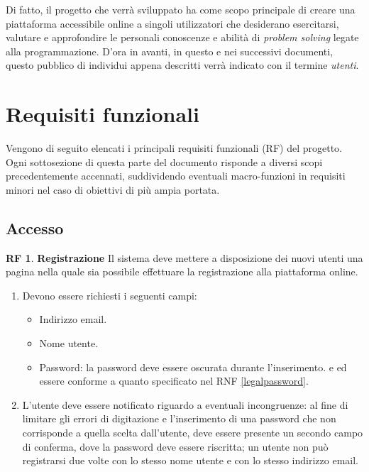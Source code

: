 \documentclass[11pt, a4paper]{article}
\theoremstyle{definition}
\newtheorem{funcreq}{RF} %
\begin{document}
Di fatto, il progetto che verrà sviluppato ha come scopo principale di
creare una piattaforma accessibile online a singoli utilizzatori che
desiderano esercitarsi, valutare e approfondire le personali
conoscenze e abilità di \textit{problem solving} legate alla programmazione.
D'ora in avanti, in questo e nei successivi documenti, questo pubblico di
individui appena descritti verrà indicato con il termine \textit{utenti}.

\newpage
\section{Requisiti funzionali}
Vengono di seguito elencati i principali requisiti funzionali (RF)
del progetto. Ogni sottosezione di questa parte del documento
risponde a diversi scopi precedentemente accennati, suddividendo
eventuali macro-funzioni in requisiti minori nel caso di obiettivi
di più ampia portata.

\subsection{Accesso}

\begin{funcreq}
\label{signup}
\textbf{Registrazione }
Il sistema deve mettere a disposizione dei nuovi utenti una pagina
nella quale sia possibile effettuare la registrazione alla piattaforma
online.

\begin{enumerate}
    \item Devono essere richiesti i seguenti campi:
    \begin{itemize}
        \item Indirizzo email.
        
        \item Nome utente.
        
        \item Password: la password deve essere oscurata durante l'inserimento.
        e ed essere conforme a quanto specificato nel RNF \ref{legalpassword}.
    \end{itemize}

    \item L'utente deve essere notificato riguardo a eventuali incongruenze:
    al fine di limitare gli errori di digitazione e l'inserimento di una
    password che non corrisponde a quella scelta dall'utente, deve essere
    presente un secondo campo di conferma, dove la password deve essere
    riscritta; un utente non può registrarsi due volte con lo stesso nome
    utente e con lo stesso indirizzo email.
\end{enumerate}

\end{funcreq}
\end{document}
